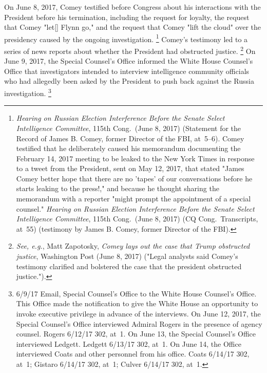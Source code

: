 {On June 8, 2017, Comey testified before Congress about his interactions with the President before his termination, including the request for loyalty, the request that Comey "let[] Flynn go," and the request that Comey "lift the cloud" over the presidency caused by the ongoing investigation.%
\footnote{\textit{Hearing on Russian Election Interference Before the Senate Select Intelligence Committee}, 115th Cong.\ (June 8, 2017) (Statement for the Record of James B. Comey, former Director of the FBI, at~5--6).
Comey testified that he deliberately caused his memorandum documenting the February 14, 2017 meeting to be leaked to the New York Times in response to a tweet from the President, sent on May 12, 2017, that stated "James Comey better hope that there are no 'tapes' of our conversations before he starts leaking to the press!," and because he thought sharing the memorandum with a reporter "might prompt the appointment of a special counsel."
\textit{Hearing on Russian Election Interference Before the Senate Select Intelligence Committee}, 115th Cong.\ (June 8, 2017) (CQ Cong.\ Transcripts, at~55) (testimony by James B. Comey, former Director of the FBI).}
Comey's testimony led to a series of news reports about whether the President had obstructed justice.%
\footnote{\textit{See, e.g.}, Matt Zapotosky, \textit{Comey lays out the case that Trump obstructed justice}, Washington Post (June 8, 2017) ("Legal analysts said Comey's testimony clarified and bolstered the case that the president obstructed justice.").}
On June 9, 2017, the Special Counsel's Office informed the White House Counsel's Office that investigators intended to interview intelligence community officials who had allegedly been asked by the President to push back against the Russia investigation.%
\footnote{6/9/17 Email, Special Counsel's Office to the White House Counsel's Office.
This Office made the notification to give the White House an opportunity to invoke executive privilege in advance of the interviews.
On June 12, 2017, the Special Counsel's Office interviewed Admiral Rogers in the presence of agency counsel.
Rogers 6/12/17 302, at~1.
On June 13, the Special Counsel's Office interviewed Ledgett.
Ledgett 6/13/17 302, at~1.
On June 14, the Office interviewed Coats and other personnel from his office.
Coats 6/14/17 302, at~1;
Gistaro 6/14/17 302, at~1;
Culver 6/14/17 302, at~1.}

}
